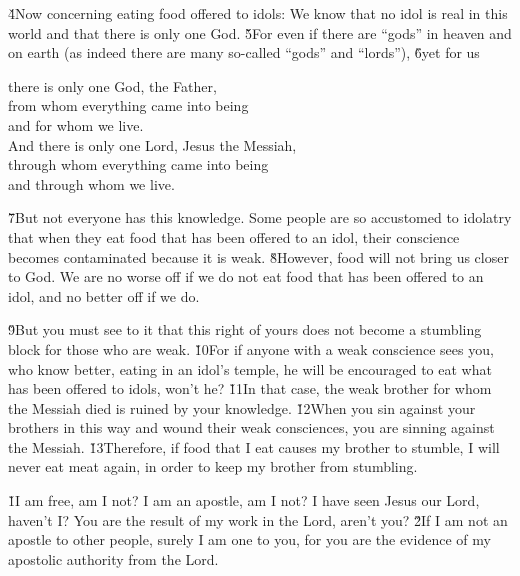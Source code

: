 \v{4}Now concerning eating food offered to idols: We know that no idol is real in this world and that there is only one God. \v{5}For even if there are ``gods'' in heaven and on earth (as indeed there are many so-called ``gods'' and ``lords''), \v{6}yet for us

\begin{poetry}
\poeml there is only one God, the Father, \\
\poemll    from whom everything came into being \\
\poemlll       and for whom we live. \\
\poeml And there is only one Lord, Jesus the Messiah, \\
\poemll    through whom everything came into being \\
\poemlll       and through whom we live.
\end{poetry}

\v{7}But not everyone has this knowledge. Some people are so accustomed to idolatry that when they eat food that has been offered to an idol, their conscience becomes contaminated because it is weak. \v{8}However, food will not bring us closer to God. We are no worse off if we do not eat food that has been offered to an idol, and no better off if we do.

\v{9}But you must see to it that this right of yours does not become a stumbling block for those who are weak. \v{10}For if anyone with a weak conscience sees you, who know better, eating in an idol's temple, he will be encouraged to eat what has been offered to idols, won't he? \v{11}In that case, the weak brother for whom the Messiah died is ruined by your knowledge. \v{12}When you sin against your brothers in this way and wound their weak consciences, you are sinning against the Messiah. \v{13}Therefore, if food that I eat causes my brother to stumble, I will never eat meat again, in order to keep my brother from stumbling.

\v{1}I am free, am I not? I am an apostle, am I not? I have seen Jesus our Lord, haven't I? You are the result of my work in the Lord, aren't you? \v{2}If I am not an apostle to other people, surely I am one to you, for you are the evidence of my apostolic authority from the Lord.

